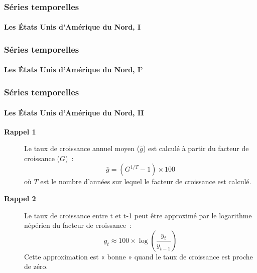 \documentclass[10pt,notheorems]{beamer}
\theoremstyle{plain}
\theoremstyle{definition} %
\begin{document}
\begin{frame}
  \frametitle{Séries temporelles}
  \framesubtitle{Les États Unis d'Amérique du Nord, I}
  \begin{center}
    
  \end{center}
\end{frame}


\begin{frame}
  \frametitle{Séries temporelles}
  \framesubtitle{Les États Unis d'Amérique du Nord, I'}
  \begin{center}
    
  \end{center}
\end{frame}


\begin{frame}
  \frametitle{Séries temporelles}
  \framesubtitle{Les États Unis d'Amérique du Nord, II}

  \begin{description}

  \item[\textbf{Rappel 1}] Le taux de croissance annuel moyen ($\bar g$) est calculé à partir du facteur de croissance ($G$)~:
    \[
      \bar g = (G^{1/T}-1)\times 100
    \]
    où $T$ est le nombre d'années sur lequel le facteur de croissance est calculé.\newline

  \item[\textbf{Rappel 2}] Le taux de croissance entre t et t-1 peut être approximé par le logarithme népérien du facteur de croissance~:
    \[
      g_t \approx 100\times\log \left(\frac{y_t}{y_{t-1}}\right)
    \]
    Cette approximation est « bonne » quand le taux de croissance est proche de zéro.
  \end{description}

\end{frame}
\end{document}
